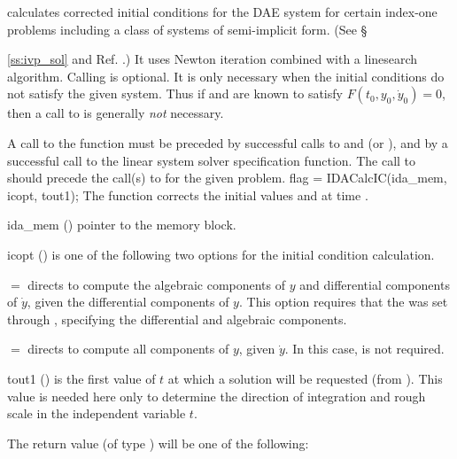  calculates corrected initial conditions for the DAE system
for certain index-one problems including a class of systems of semi-implicit
form.  (See \S{\ref{ss:ivp_sol} and Ref. \cite{BHP:98}.)
It uses Newton iteration combined with a linesearch algorithm.
Calling  is optional. It is only necessary when the  
initial conditions do not satisfy the given system.  Thus if   
 and  are known to satisfy $F(t_0, y_0, \dot{y}_0) = 0$, 
then a call to  is generally {\em not} necessary.

A call to the function  must be preceded by successful calls to  
 and  (or ), and by a 
successful call to the linear system solver specification function.  
The call to  should precede the call(s) to   
for the given problem.
%
{
  flag = IDACalcIC(ida\_mem, icopt, tout1);
}
{
  The function  corrects the initial values  and  at
  time .
}
{
  \begin{args}

  \item[ida\_mem] ()
    pointer to the {\ida} memory block.

  \item[icopt] ()
    is one of the following two options for the initial condition calculation.
    
    $ = $ directs  to compute 
    the algebraic components of $y$ and differential components of $\dot{y}$, 
    given the differential components of $y$.  
    This option requires that the   was set through 
    , specifying the differential and algebraic components.  
    
    $ = $ directs  to compute all  
    components of $y$, given $\dot{y}$.  In this case,  is not required.

  \item[tout1] ()
    is the first value of $t$ at which a solution will be requested (from
    ).  This value is needed here only to determine the direction of
    integration and rough scale in the independent variable $t$.   

  \end{args}
}
{
  The return value  (of type ) will be one of the following:

}}
